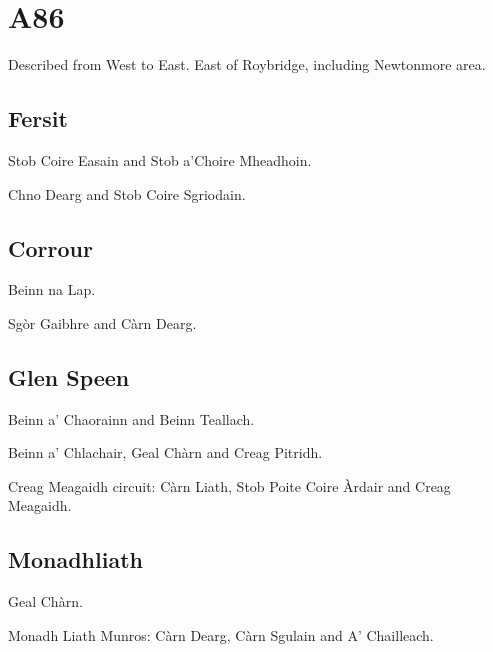 
\section{A86}

Described from West to East.  East of Roybridge, including Newtonmore area.

\subsection{Fersit}

\begin{munros}
\item
Stob Coire Easain and Stob a'Choire Mheadhoin.

\item
Chno Dearg and Stob Coire Sgriodain.
\end{munros}


\subsection{Corrour}

\begin{munros}
\item
Beinn na Lap.

\item
Sgòr Gaibhre and Càrn Dearg.
\end{munros}


\subsection{Glen Speen} 

\begin{munros}
\item
Beinn a' Chaorainn and Beinn Teallach.

\item
Beinn a' Chlachair, Geal Chàrn and Creag Pitridh.

\item
Creag Meagaidh circuit: Càrn Liath, Stob Poite Coire Àrdair and Creag Meagaidh.
\end{munros}


\subsection{Monadhliath}

\begin{munros}
\item
Geal Chàrn.

\item
Monadh Liath Munros: Càrn Dearg, Càrn Sgulain and A' Chailleach.
\end{munros}
